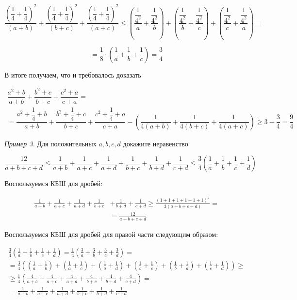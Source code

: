 $$
\dfrac{\left(\dfrac{1}{4}+\dfrac{1}{4}\right)^2}{(a+b)}+\dfrac{\left(\dfrac{1}{4}+\dfrac{1}{4}\right)^2}{(b+c)}+\dfrac{\left(\dfrac{1}{4}+\dfrac{1}{4}\right)^2}{(a+c)} \leqslant\left(\dfrac{\dfrac{1}{4^2}}{a}+\dfrac{\dfrac{1}{4^2}}{b}\right)+\left(\dfrac{\dfrac{1}{4^2}}{b}+\dfrac{\dfrac{1}{4^2}}{c}\right)+\left(\dfrac{\dfrac{1}{4^2}}{c}+\dfrac{\dfrac{1}{4^2}}{a}\right)=
$$

$$
=\dfrac{1}{8} \cdot\left(\dfrac{1}{a}+\dfrac{1}{b}+\dfrac{1}{c}\right)=\dfrac{3}{4}
$$


В итоге получаем, что и требовалось доказать

$$
\begin{gathered}
\dfrac{a^2+b}{a+b}+\dfrac{b^2+c}{b+c}+\dfrac{c^2+a}{c+a}= \\
=\dfrac{a^2+\dfrac{1}{4}+b}{a+b}+\dfrac{b^2+\dfrac{1}{4}+c}{b+c}+\dfrac{c^2+\dfrac{1}{4}+a}{c+a}-\left(\dfrac{1}{4(a+b)}+\dfrac{1}{4(b+c)}+\dfrac{1}{4(a+c)}\right) \geqslant 3-\dfrac{3}{4}=\dfrac{9}{4}
\end{gathered}
$$

\textit{Пример 3.}
Для положительных $a, b, c, d$ докажите неравенство

$$
\frac{12}{a+b+c+d} \leqslant \frac{1}{a+b}+\frac{1}{a+c}+\frac{1}{a+d}+\frac{1}{b+c}+\frac{1}{b+d}+\frac{1}{c+d} \leqslant \frac{3}{4}\left(\frac{1}{a}+\frac{1}{b}+\frac{1}{c}+\frac{1}{d}\right)
$$

Воспользуемся КБШ для дробей:

$$
\begin{aligned}
\frac{1}{a+b}+\frac{1}{a+c}+\frac{1}{a+d}+\frac{1}{b+c} & +\frac{1}{b+d}+\frac{1}{c+d} \geqslant \frac{(1+1+1+1+1+1)^2}{3(a+b+c+d)}= \\
& =\frac{12}{a+b+c+d}
\end{aligned}
$$


Воспользуемся КБШ для дробей для правой части следующим образом:

$$
\begin{gathered}
\frac{3}{4}\left(\frac{1}{a}+\frac{1}{b}+\frac{1}{c}+\frac{1}{d}\right)=\frac{1}{4}\left(\frac{3}{a}+\frac{3}{b}+\frac{3}{c}+\frac{3}{d}\right)= \\
=\frac{3}{4}\left(\left(\frac{1}{a}+\frac{1}{b}\right)+\left(\frac{1}{a}+\frac{1}{c}\right)+\left(\frac{1}{a}+\frac{1}{d}\right)+\left(\frac{1}{b}+\frac{1}{c}\right)+\left(\frac{1}{b}+\frac{1}{d}\right)+\left(\frac{1}{c}+\frac{1}{d}\right)\right) \geqslant \\
\geqslant \frac{1}{4}\left(\frac{4}{a+b}+\frac{4}{a+c}+\frac{4}{a+d}+\frac{4}{b+c}+\frac{4}{b+d}+\frac{4}{c+d}\right)= \\
=\frac{1}{a+b}+\frac{1}{a+c}+\frac{1}{a+d}+\frac{1}{b+c}+\frac{1}{b+d}+\frac{1}{c+d}
\end{gathered}
$$

